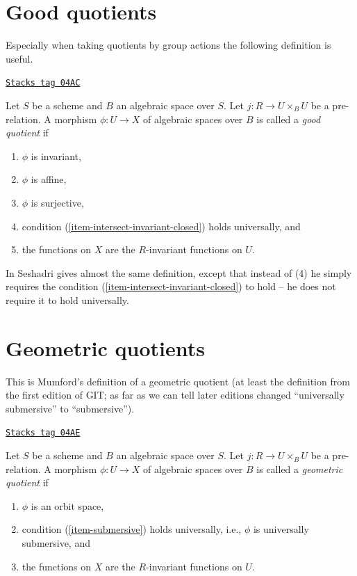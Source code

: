 \section{Good quotients}
\label{groupoids-quotients-section-good}
Especially when taking quotients by group actions the following definition
is useful.

\begin{definition}[Good]
\label{groupoids-quotients-definition-good}
\href{https://stacks.math.columbia.edu/tag/04AC}{\texttt{Stacks tag 04AC}}

Let $S$ be a scheme and $B$ an algebraic space over $S$.
Let $j : R \to U \times_B U$ be a pre-relation.
A morphism $\phi : U \to X$ of algebraic spaces over $B$
is called a {\it good quotient} if
\begin{enumerate}
\item $\phi$ is invariant,
\item $\phi$ is affine,
\item $\phi$ is surjective,
\item condition (\ref{item-intersect-invariant-closed}) holds universally, and
\item the functions on $X$ are the $R$-invariant functions on $U$.
\end{enumerate}
\end{definition}

In \cite{seshadri_quotients} Seshadri gives almost the same definition,
except that instead of (4) he simply requires the condition
(\ref{item-intersect-invariant-closed}) to hold -- he does not require
it to hold universally.

\section{Geometric quotients}
\label{groupoids-quotients-section-geometric}
This is Mumford's definition of a geometric quotient (at least the definition
from the first edition of GIT; as far as we can tell later editions
changed ``universally submersive'' to ``submersive'').

\begin{definition}[Geometric]
\label{groupoids-quotients-definition-geometric}
\href{https://stacks.math.columbia.edu/tag/04AE}{\texttt{Stacks tag 04AE}}

Let $S$ be a scheme and $B$ an algebraic space over $S$.
Let $j : R \to U \times_B U$ be a pre-relation.
A morphism $\phi : U \to X$ of algebraic spaces over $B$
is called a {\it geometric quotient} if
\begin{enumerate}
\item $\phi$ is an orbit space,
\item condition (\ref{item-submersive}) holds universally, i.e.,
$\phi$ is universally submersive, and
\item the functions on $X$ are the $R$-invariant functions on $U$.
\end{enumerate}
\end{definition}



